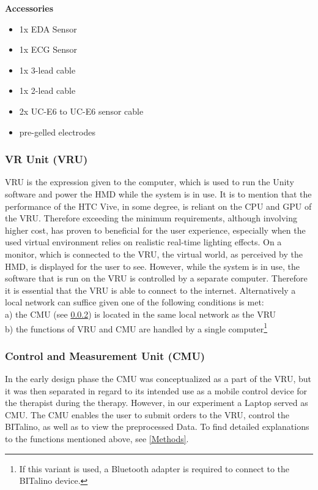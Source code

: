 \textbf{Accessories}
\begin{itemize}
\item 1x EDA Sensor
\item 1x ECG Sensor
\item 1x 3-lead cable
\item 1x 2-lead cable
\item 2x UC-E6 to UC-E6 sensor cable
\item pre-gelled electrodes
\end{itemize}

\subsubsection{VR Unit (VRU)}
VRU is the expression given to the computer, which is used to run the Unity software and power the HMD while the system is in use. It is to mention that the performance of the HTC Vive, in some degree, is reliant on the CPU and GPU of the VRU. Therefore exceeding the minimum requirements, although involving higher cost, has proven to beneficial for the user experience, especially when the used virtual environment relies on realistic real-time lighting effects. On a monitor, which is connected to the VRU, the virtual world, as perceived by the HMD, is displayed for the user to see. However, while the system is in use, the software that is run on the VRU is controlled by a separate computer. Therefore it is essential that the VRU is able to connect to the internet. Alternatively a local network can suffice given one of the following conditions is met:\\[10pt]
a) the CMU (see \ref{CMU}) is located in the same local network as the VRU\\
b) the functions of VRU and CMU are handled by a single computer\footnote{If this variant is used, a Bluetooth adapter is required to connect to the BITalino device.}\\[10pt]
 
\subsubsection{Control and Measurement Unit (CMU)}\label{CMU}
In the early design phase the CMU was conceptualized as a part of the VRU, but it was then separated in regard to its intended use as a mobile control device for the therapist during the therapy. However, in our experiment a Laptop served as CMU. The CMU enables the user to submit orders to the VRU, control the BITalino, as well as to view the preprocessed Data. To find detailed explanations to the functions mentioned above, see \ref{Methods}.


